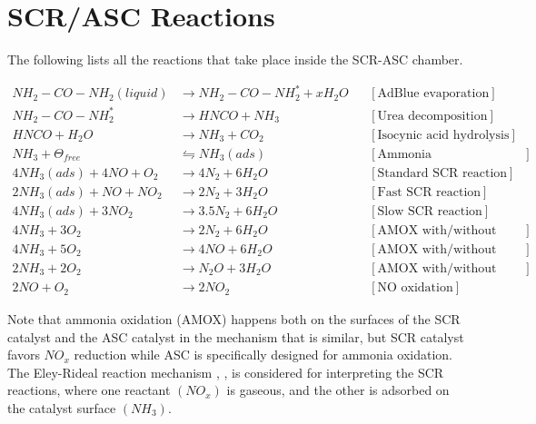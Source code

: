 \newpage
\section{SCR/ASC Reactions}
The following lists all the reactions that take place inside the SCR-ASC chamber.

\begin{align*}
    NH_2 - CO - NH_2 (liquid) &\longrightarrow NH_2 - CO - NH_2^* + x H_2 O
                & &[\text{AdBlue evaporation}] \\
    NH_2 - CO - NH_2^*  &\longrightarrow  HNCO + NH_3
                & &[\text{Urea decomposition}] \\
    HNCO + H_2O &\longrightarrow NH_3 + CO_2
                & &[\text{Isocynic acid hydrolysis}] \\
    NH_3 + \Theta_{free} &\leftrightharpoons NH_3(ads)
                         & &[\text{Ammonia Adsorption/Desorption}]\\
    4 NH_3 (ads) + 4 NO + O_2 &\longrightarrow 4 N_2 + 6 H_2O
                              & &[\text{Standard SCR reaction}]\\
    2 NH_3 (ads) +  NO + N O_2 &\longrightarrow 2 N_2 + 3 H_2O
                              & &[\text{Fast SCR reaction}]\\
    4 NH_3 (ads) + 3N O_2 &\longrightarrow 3.5 N_2 + 6 H_2O
                              & &[\text{Slow SCR reaction}]\\
    4 NH_3 + 3 O_2 &\longrightarrow 2 N_2 + 6 H_2O
                         & &[\text{AMOX with/without ASC}]\\
    4 NH_3 + 5 O_2 &\longrightarrow 4 NO + 6 H_2 O
                         & &[\text{AMOX with/without ASC}]\\
    2 NH_3 + 2 O_2 &\longrightarrow N_2O + 3 H_2O
                         & &[\text{AMOX with/without ASC}]\\
    2 NO + O_2 &\longrightarrow 2 NO_2
                        & &[\text{NO oxidation}]
\end{align*}

Note that ammonia oxidation (AMOX) happens both on the surfaces of the SCR catalyst and the ASC catalyst in the
mechanism that is similar, but SCR catalyst favors $NO_x$ reduction while ASC is specifically designed for ammonia
oxidation. The Eley-Rideal reaction mechanism \cite{yuan2015diesel}, \cite{hsieh2011development}, \cite{nova2014urea} is
considered for interpreting the SCR reactions, where one reactant $(NO_x)$ is gaseous, and the other is adsorbed on the
catalyst surface $(NH_3)$.

